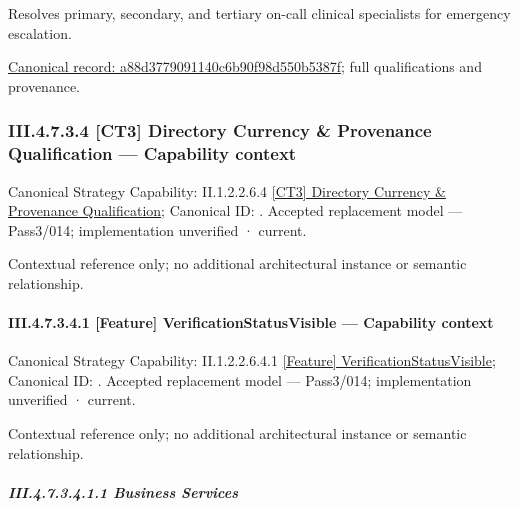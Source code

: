 Resolves primary, secondary, and tertiary on-call clinical specialists for emergency escalation.


{\footnotesize \href{../../../../../../../../continuum/business/business-function/a88d3779091140c6b90f98d550b5387f.md}{Canonical record: a88d3779091140c6b90f98d550b5387f}; full qualifications and provenance.}\par
\subsubsection*{III.4.7.3.4 [CT3] Directory Currency \& Provenance Qualification — Capability context}
\label{navigation:III.4.7.3.4}

{\small Canonical Strategy Capability: II.1.2.2.6.4 \hyperref[element:21e0c3d5b39b4d6c9c082241150f1f09]{[CT3] Directory Currency \& Provenance Qualification}; Canonical ID: \texttt{}. Accepted replacement model — Pass3/014; implementation unverified · current.}\par
Contextual reference only; no additional architectural instance or semantic relationship.\par
\paragraph*{III.4.7.3.4.1 [Feature] VerificationStatusVisible — Capability context}
\label{navigation:III.4.7.3.4.1}

{\small Canonical Strategy Capability: II.1.2.2.6.4.1 \hyperref[element:2275144b93364b2ca3f2368b69e1ce80]{[Feature] VerificationStatusVisible}; Canonical ID: \texttt{}. Accepted replacement model — Pass3/014; implementation unverified · current.}\par
Contextual reference only; no additional architectural instance or semantic relationship.\par
\subparagraph*{III.4.7.3.4.1.1 Business Services}
\label{navigation:III.4.7.3.4.1.1}

\label{navigation:III.4.7.3.4.1.1.1}

